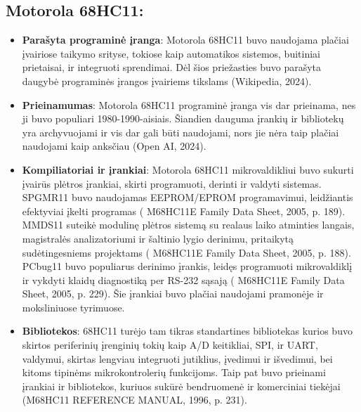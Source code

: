 \documentclass[a4paper,12pt]{article}
\begin{document}
\subsection{Motorola 68HC11:}
\begin{itemize}
    \item \textbf{Parašyta programinė įranga}: Motorola 68HC11 buvo naudojama plačiai įvairiose taikymo srityse, tokiose kaip automatikos sistemos, buitiniai prietaisai, ir integruoti sprendimai. Dėl šios priežasties buvo parašyta daugybė programinės įrangos įvairiems tikslams (Wikipedia, 2024).
    \item \textbf{Prieinamumas}: Motorola 68HC11 programinė įranga vis dar prieinama, nes ji
buvo populiari 1980-1990-aisiais. Šiandien dauguma įrankių ir bibliotekų yra archyvuojami ir vis dar gali būti naudojami, nors jie nėra taip plačiai naudojami kaip
anksčiau (Open AI, 2024).
    \item \textbf{Kompiliatoriai ir įrankiai}: Motorola 68HC11 mikrovaldikliui buvo sukurti įvairūs plėtros įrankiai, skirti programuoti, derinti ir valdyti sistemas. SPGMR11 buvo naudojamas EEPROM/EPROM programavimui, leidžiantis efektyviai įkelti programas ( M68HC11E Family
 Data Sheet, 2005, p. 189). MMDS11 suteikė modulinę plėtros sistemą su realaus laiko atminties langais, magistralės analizatoriumi ir šaltinio lygio derinimu, pritaikytą sudėtingesniems projektams ( M68HC11E Family
 Data Sheet, 2005, p. 188). PCbug11 buvo populiarus derinimo įrankis, leidęs programuoti mikrovaldiklį ir vykdyti klaidų diagnostiką per RS-232 sąsają ( M68HC11E Family Data Sheet, 2005, p. 229). Šie įrankiai buvo plačiai naudojami pramonėje ir moksliniuose tyrimuose.
    \item \textbf{Bibliotekos}: 68HC11 turėjo tam tikras standartines bibliotekas kurios buvo skirtos periferinių įrenginių tokių kaip A/D keitikliai, SPI, ir UART, valdymui, skirtas lengviau integruoti jutiklius, įvedimui ir išvedimui, bei kitoms tipinėms mikrokontrolerių funkcijoms. Taip pat buvo prieinami įrankiai ir bibliotekos, kuriuos sukūrė bendruomenė ir komerciniai tiekėjai (M68HC11
 REFERENCE MANUAL, 1996, p. 231).
\end{itemize}
\end{document}

